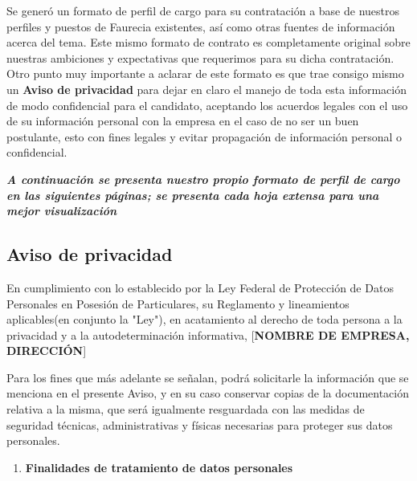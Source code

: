 \documentclass[letterpaper,12pt]{article}
\begin{document}
\begin{sloppypar}
Se generó un formato de perfil de cargo para su contratación a base de nuestros perfiles y puestos de Faurecia existentes, así como otras fuentes de información acerca del tema. Este mismo formato de contrato es completamente original sobre nuestras ambiciones y expectativas que requerimos para su dicha contratación. 
\vspace{0.3cm}\\ 
Otro punto muy importante a aclarar de este formato es que trae consigo mismo un \textbf{Aviso de privacidad} para dejar en claro el manejo de toda esta información de modo confidencial para el candidato, aceptando los acuerdos legales con el uso de su información personal con la empresa en el caso de no ser un buen postulante, esto con fines legales y evitar propagación de información personal o confidencial.

\begin{center}
    \textbf{\textit{A continuación se presenta nuestro propio formato de perfil de cargo en las siguientes páginas; se presenta cada hoja extensa para una mejor visualización}}
\end{center}



\newpage



\newpage 



\subsection{Aviso de privacidad}
En cumplimiento con lo establecido por la Ley Federal de Protección de Datos Personales en Posesión de Particulares, su Reglamento y lineamientos aplicables(en conjunto la "Ley"), en acatamiento al derecho de toda persona a la privacidad y a la autodeterminación informativa, [\textbf{NOMBRE DE EMPRESA, DIRECCIÓN}] 

Para los fines que más adelante se señalan, podrá solicitarle la información que se menciona en el presente Aviso, y en su caso conservar copias de la documentación relativa a la
misma, que será igualmente resguardada con las medidas de seguridad técnicas, administrativas y físicas necesarias para proteger sus datos personales. 

\begin{enumerate}
    \item \textbf{Finalidades de tratamiento de datos personales}
    

\end{enumerate}
\end{sloppypar}
\end{document}
